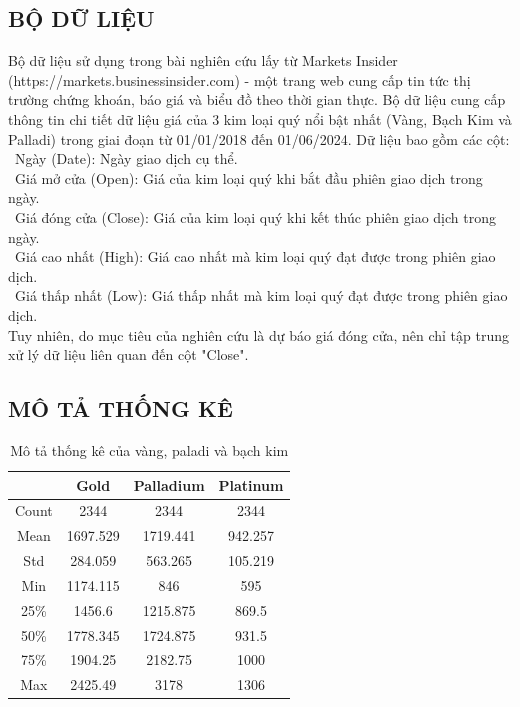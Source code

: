 \subsection{BỘ DỮ LIỆU}
Bộ dữ liệu sử dụng trong bài nghiên cứu lấy từ  Markets Insider (https://markets.businessinsider.com) - một trang web cung cấp tin tức thị trường chứng khoán, báo giá và biểu đồ theo thời gian thực. Bộ dữ liệu cung cấp thông tin chi tiết dữ liệu giá của 3 kim loại quý nổi bật nhất (Vàng, Bạch Kim và Palladi) trong giai đoạn từ 01/01/2018 đến 01/06/2024. Dữ liệu bao gồm các cột:\\
\indent\textbullet\ Ngày (Date): Ngày giao dịch cụ thể.\\
\indent\textbullet\ Giá mở cửa (Open): Giá của kim loại quý khi bắt đầu phiên giao dịch trong ngày.\\
\indent\textbullet\ Giá đóng cửa (Close): Giá của kim loại quý khi kết thúc phiên giao dịch trong ngày.\\
\indent\textbullet\ Giá cao nhất (High): Giá cao nhất mà kim loại quý đạt được trong phiên giao dịch.\\
\indent\textbullet\ Giá thấp nhất (Low): Giá thấp nhất mà kim loại quý đạt được trong phiên giao dịch.\\
Tuy nhiên, do mục tiêu của nghiên cứu là dự báo giá đóng cửa, nên chỉ tập trung xử lý dữ liệu liên quan đến cột "Close".

\subsection{MÔ TẢ THỐNG KÊ}
\begin{table}[htbp]
  \centering
\begin{tabular}{|c|c|c|c|}
    \hline
     \  & Gold & Palladium & Platinum \\ \hline
     Count & 2344 & 2344 & 2344\\ \hline
     Mean & 1697.529 & 1719.441 & 942.257\\ \hline
     Std & 284.059 & 563.265 & 105.219\\ \hline
     Min & 1174.115 & 846 & 595\\ \hline
     25\% & 1456.6 & 1215.875 & 869.5\\ \hline
     50\% & 1778.345 & 1724.875 & 931.5\\ \hline
     75\% & 1904.25 & 2182.75 & 1000\\ \hline
     Max & 2425.49 & 3178 & 1306\\ \hline
\end{tabular}
\caption{Mô tả thống kê của vàng, paladi và bạch kim}
\end{table}

